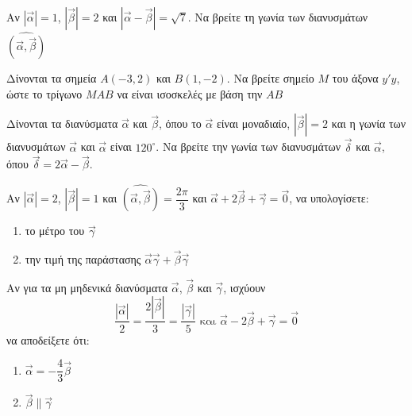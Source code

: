 \documentclass[greek]{beamer}
\begin{document}
\begin{askisi}
  Αν $|\vec{α}|=1$, $|\vec{β}|=2$ και $|\vec{α}-\vec{β}|=\sqrt{7}$. Να βρείτε τη γωνία των διανυσμάτων $\widehat{(\vec{α }, \vec{β })}$

\end{askisi}

\begin{askisi}
  Δίνονται τα σημεία $Α(-3,2)$ και $Β(1,-2)$. Να βρείτε σημείο $Μ$ του άξονα $y'y$, ώστε το τρίγωνο $ΜΑΒ$ να είναι ισοσκελές με βάση την $ΑΒ$

\end{askisi}

\begin{askisi}
  Δίνονται τα διανύσματα $\vec{α}$ και $\vec{β}$, όπου το $\vec{α}$ είναι μοναδιαίο, $|\vec{β}|=2$ και η γωνία των διανυσμάτων $\vec{α}$ και $\vec{α}$ είναι $120^{\circ}$. Να βρείτε την γωνία των διανυσμάτων $\vec{δ}$ και $\vec{α}$, όπου $\vec{δ}=2\vec{α}-\vec{β}$.

\end{askisi}

\begin{askisi}
  Αν $|\vec{α}|=2$, $|\vec{β}|=1$ και $\widehat{(\vec{α }, \vec{β })}=\dfrac{2\pi}{3}$ και $\vec{α}+2\vec{β}+\vec{γ}=\vec{0}$, να υπολογίσετε:
  \begin{enumerate}
    \item<1-> το μέτρο του $\vec{γ}$
    \item<2-> την τιμή της παράστασης $\vec{α}\vec{γ}+\vec{β}\vec{γ}$
  \end{enumerate}

\end{askisi}

\begin{askisi}
  Αν για τα μη μηδενικά διανύσματα $\vec{α}$, $\vec{β}$ και $\vec{γ}$, ισχύουν
  $$\dfrac{|\vec{α}|}{2}=\dfrac{2|\vec{β}|}{3}=\dfrac{|\vec{γ}|}{5} \text{ και } \vec{α}-2\vec{β}+\vec{γ}=\vec{0}$$
  να αποδείξετε ότι:
  \begin{enumerate}
    \item<1-> $\vec{α}=-\dfrac{4}{3}\vec{β}$
    \item<2-> $\vec{β}\parallel \vec{γ}$
  \end{enumerate}

\end{askisi}
\end{document}
